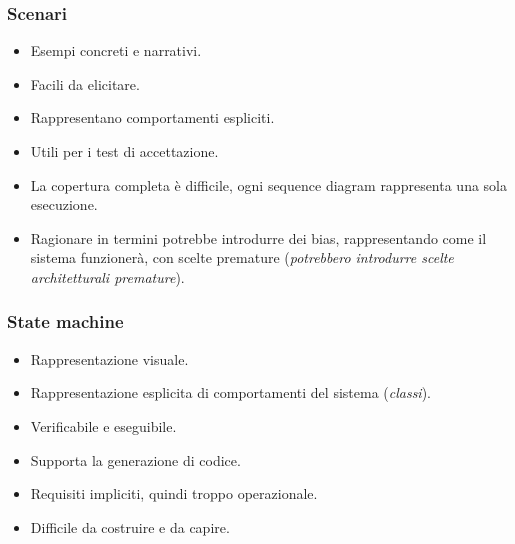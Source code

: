 \subsubsection{Scenari}
\begin{tcolorbox}[colback=green!5!white,colframe=green!75!black, title=Vantaggi degli scenari]
    \begin{itemize}
        \item Esempi concreti e narrativi.
        \item Facili da elicitare.
        \item Rappresentano comportamenti espliciti.
        \item Utili per i test di accettazione.
    \end{itemize}
\end{tcolorbox}
\begin{tcolorbox}[colback=red!5!white,colframe=red!75!black, title=Limiti degli scenari]
    \begin{itemize}
        \item La copertura completa è difficile, ogni sequence diagram rappresenta
        una sola esecuzione.
        \item Ragionare in termini potrebbe introdurre dei bias, rappresentando 
        come il sistema funzionerà, con scelte premature (\textit{potrebbero introdurre 
        scelte architetturali premature}).
    \end{itemize}
\end{tcolorbox}
\subsubsection{State machine}
\begin{tcolorbox}[colback=green!5!white,colframe=green!75!black, title=Vantaggi delle state machine]
    \begin{itemize}
        \item Rappresentazione visuale.
        \item Rappresentazione esplicita di comportamenti del sistema (\textit{classi}).
        \item Verificabile e eseguibile.
        \item Supporta la generazione di codice.
    \end{itemize}
\end{tcolorbox}
\begin{tcolorbox}[colback=red!5!white,colframe=red!75!black, title=Limiti delle state machine]
    \begin{itemize}
        \item Requisiti impliciti, quindi troppo operazionale.
        \item Difficile da costruire e da capire.
    \end{itemize}
\end{tcolorbox}